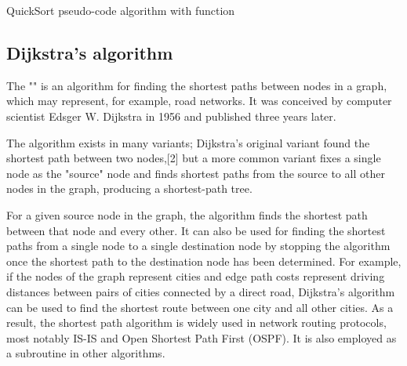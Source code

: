 	 \begin{algorithm}[H]
		\SetAlgoLined\DontPrintSemicolon
		\setcounter{AlgoLine}{0}
  		\caption{QuickSort pseudo-code algorithm with function}
  	\end{algorithm}
  	
  	\subsection{Dijkstra's algorithm }
	The "" is an algorithm for finding the shortest paths between nodes in a graph, which may represent, for example, road networks. It was conceived by computer scientist Edsger W. Dijkstra in 1956 and published three years later.
	
	The algorithm exists in many variants; Dijkstra's original variant found the shortest path between two nodes,[2] but a more common variant fixes a single node as the "source" node and finds shortest paths from the source to all other nodes in the graph, producing a shortest-path tree.
	
	For a given source node in the graph, the algorithm finds the shortest path between that node and every other. It can also be used for finding the shortest paths from a single node to a single destination node by stopping the algorithm once the shortest path to the destination node has been determined. For example, if the nodes of the graph represent cities and edge path costs represent driving distances between pairs of cities connected by a direct road, Dijkstra's algorithm can be used to find the shortest route between one city and all other cities. As a result, the shortest path algorithm is widely used in network routing protocols, most notably IS-IS and Open Shortest Path First (OSPF). It is also employed as a subroutine in other algorithms.
	
